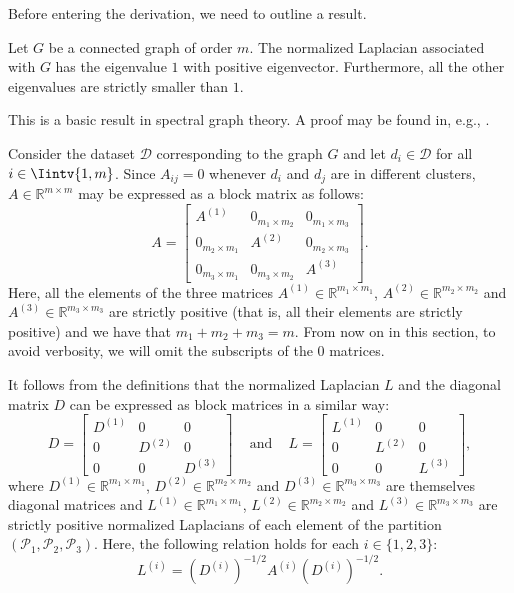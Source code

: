 Before entering the derivation, we need to outline a result.

\begin{proposition}
   \label{bigeigenvalue}
   Let $G$ be a connected graph of order $m$.
   The normalized Laplacian associated with $G$ has the eigenvalue $1$ with positive eigenvector.
   Furthermore, all the other eigenvalues are strictly smaller than $1$.
\end{proposition}
This is a basic result in spectral graph theory.
A proof may be found in, e.g., \cite{mahoney}.

Consider the dataset $\mathcal D$ corresponding to the graph $G$ and let $d_i \in \mathcal D$ for all $i \in \Iintv{1,m}$. Since $A_{ij} = 0$ whenever $d_i$ and $d_j$ are in different clusters, $A \in \mathbb{R} ^{m \times m}$ may be expressed as a block matrix as follows:
\begin{equation}
   A = 
   \begin{bmatrix}
      A^{(1)} & 0_{m_1 \times m_2} & 0_{m_1 \times m_3} \\
      0_{m_2 \times m_1} & A^{(2)} & 0_{m_2 \times m_3} \\
      0_{m_3 \times m_1} & 0_{m_3 \times m_2} & A^{(3)}
   \end{bmatrix}.
\end{equation}
Here, all the elements of the three matrices $A^{(1)} \in \mathbb R^{m_1 \times m_1}$, $A^{(2)} \in \mathbb R^{m_2 \times m_2}$ and $A^{(3)} \in \mathbb R ^{m_3 \times m_3}$ are strictly positive (that is, all their elements are strictly positive) and we have that $m_1+m_2+m_3 = m$. 
From now on in this section, to avoid verbosity, we will omit the subscripts of the $0$ matrices.

It follows from the definitions that the normalized Laplacian $L$ and the diagonal matrix $D$ can be expressed as block matrices in a similar way:
\begin{equation}
 D =
   \begin{bmatrix}
      D^{(1)} & 0 & 0 \\
      0 & D^{(2)} & 0 \\
      0 & 0 & D^{(3)}
   \end{bmatrix}
   \,\,\,\,\,\text{ and }\,\,\,\,\,
   L = 
   \begin{bmatrix}
      L^{(1)} & 0 & 0 \\
      0 & L^{(2)} & 0 \\
      0 & 0 & L^{(3)}
   \end{bmatrix},
\end{equation}
where $D^{(1)} \in \mathbb R ^{m_1 \times m_1}$, $D^{(2)} \in \mathbb R ^{m_2 \times m_2}$ and $D^{(3)} \in \mathbb R ^{m_3 \times m_3}$ are themselves diagonal matrices and $L^{(1)} \in \mathbb R ^{m_1 \times m_1}$, $L^{(2)} \in \mathbb R ^{m_2 \times m_2}$ and $L^{(3)} \in \mathbb R ^{m_3 \times m_3}$ are strictly positive normalized Laplacians of each element of the partition $(\mathcal P_1, \mathcal P_2, \mathcal P_3)$.
Here, the following relation holds for each $i \in \{1, 2, 3 \}$:
\begin{equation}
   L^{(i)} = \left( D^{(i)} \right) ^{-1/2} A^{(i)} \left( D^{(i)} \right) ^{-1/2}.
\end{equation}

